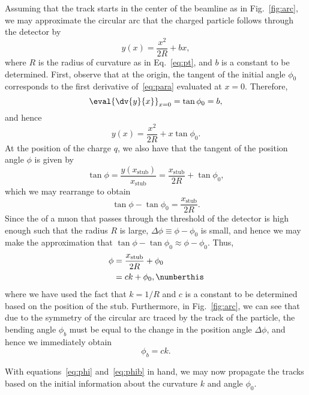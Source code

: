 Assuming that the track starts in the center of the beamline as in Fig.~\ref{fig:arc}, we may approximate the circular arc that the charged particle follows through the detector by
\begin{equation}\label{eq:para}
  y(x)=\frac{x^2}{2R}+bx,
\end{equation}
where $R$ is the radius of curvature as in Eq.~\ref{eq:pt}, and $b$ is a constant to be determined.
First, observe that at the origin, the tangent of the initial angle $\phi_0$ corresponds to the first derivative of~\ref{eq:para} evaluated at $x=0$. Therefore,
\begin{equation}
  \eval{\dv{y}{x}}_{x=0}=\tan\phi_0=b,
\end{equation}
and hence
\begin{equation}
  y(x)=\frac{x^2}{2R}+x\tan\phi_0.
\end{equation}
At the position of the charge $q$, we also have that the tangent of the position angle $\phi$ is given by
\begin{equation}
  \tan\phi=\frac{y(x_\mathrm{stub})}{x_\mathrm{stub}}=\frac{x_\mathrm{stub}}{2R}+\tan\phi_0,
\end{equation}
which we may rearrange to obtain
\begin{equation}
  \tan\phi-\tan\phi_0=\frac{x_\mathrm{stub}}{2R}.
\end{equation}
Since the \pt of a muon that passes through the threshold of the detector is high enough such that the radius $R$ is large, $\Delta\phi\equiv\phi-\phi_0$ is small, and hence we may make the approximation that $\tan\phi-\tan\phi_0\approx\phi-\phi_0$.
Thus,
\begin{align*}\label{eq:phi}
  \phi &= \frac{x_\mathrm{stub}}{2R}+\phi_0\\
  &= ck+\phi_0,
  \numberthis
\end{align*}
where we have used the fact that $k=1/R$ and $c$ is a constant to be determined based on the position of the stub.
Furthermore, in Fig.~\ref{fig:arc}, we can see that due to the symmetry of the circular arc traced by the track of the particle, the bending angle $\phi_b$ must be equal to the change in the position angle $\Delta\phi$, and hence we immediately obtain
\begin{equation}\label{eq:phib}
  \phi_b=ck.
\end{equation}

With equations~\ref{eq:phi} and~\ref{eq:phib} in hand, we may now propagate the tracks based on the initial information about the curvature $k$ and angle $\phi_0$.


